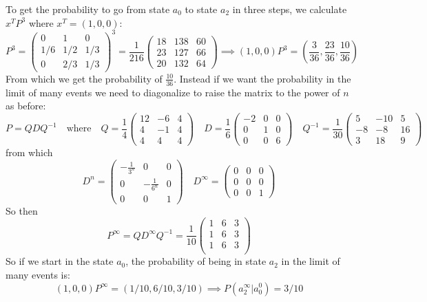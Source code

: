 \documentclass[../main.tex]{subfiles}
\begin{document}
To get the probability to go from state $a_0$ to state $a_2$ in three steps, we calculate $x^TP^3$ where $x^T=(1, 0, 0)$:
\[
P^3 = \begin{pmatrix}
        0 & 1 & 0 \\
        1/6 & 1/2 & 1/3 \\
        0 & 2/3 & 1/3
    \end{pmatrix}^3 = \frac{1}{216}
    \begin{pmatrix}
        18 & 138 & 60 \\
        23 & 127 & 66 \\
        20 & 132 & 64
    \end{pmatrix}\implies (1, 0, 0)P^3 = \left(\frac{3}{36}, \frac{23}{36}, \frac{10}{36}\right)
\]
From which we get the probability of $\frac{10}{36}$. Instead if we want the probability in the limit of many events we need to diagonalize to raise the matrix to the power of $n$ as before:
\renewcommand\arraystretch{1.2}
\[
P = QDQ^{-1}\quad \text{where}\quad
Q = \frac{1}{4}
\begin{pmatrix}
12 & -6 & 4 \\
4 & -1 & 4 \\
4 & 4 & 4
\end{pmatrix}
\quad
D = \frac{1}{6}\begin{pmatrix}
-2 & 0 & 0 \\
0 & 1 & 0 \\
0 & 0 & 6
\end{pmatrix}
\quad
Q^{-1} = \frac{1}{30}\begin{pmatrix}
5 & -10 & 5 \\
-8 & -8 & 16 \\
3 & 18 & 9
\end{pmatrix}
\]
from which
\[
D^n = \begin{pmatrix}
-\frac{1}{3^n} & 0 & 0 \\
0 & -\frac{1}{6^n} & 0 \\
0 & 0 & 1
\end{pmatrix}
\quad
D^{\infty} = \begin{pmatrix}
0 & 0 & 0 \\
0 & 0 & 0 \\
0 & 0 & 1
\end{pmatrix}
\]
So then
\[
P^\infty = QD^{\infty} Q^{-1} = \frac{1}{10}\begin{pmatrix}
1 & 6 & 3 \\
1 & 6 & 3 \\
1 & 6 & 3 \\
\end{pmatrix}
\]
So if we start in the state $a_0$, the probability of being in state $a_2$ in the limit of many events is:
\[
(1, 0, 0)P^\infty = (1/10, 6/10, 3/10) \implies P(a_2^{\infty}|a_0^0) = 3/10
\]
\end{document}
